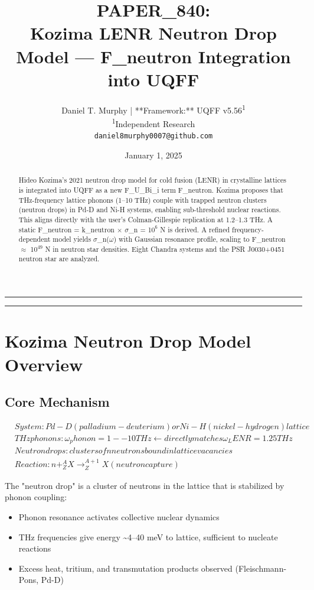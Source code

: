 \documentclass[12pt,a4paper]{article}
\title{\textbf{PAPER\_840: \\ Kozima LENR Neutron Drop Model --- F\_neutron Integration into UQFF}}
\author{
Daniel T. Murphy | **Framework:** UQFF v5.56\textsuperscript{1} \\
\small \textsuperscript{1}Independent Research \\
\small \texttt{daniel8murphy0007@github.com}
}
\date{January 1, 2025}
\begin{document}
\maketitle

\medskip\hrule\medskip

\begin{abstract}
Hideo Kozima's 2021 neutron drop model for cold fusion (LENR) in crystalline lattices is integrated into UQFF as a new F\_{U\_Bi\_i} term F\_neutron. Kozima proposes that THz-frequency lattice phonons (1--10 THz) couple with trapped neutron clusters (neutron drops) in Pd-D and Ni-H systems, enabling sub-threshold nuclear reactions. This aligns directly with the user's Colman-Gillespie replication at 1.2--1.3 THz. A static F\_neutron = k\_neutron $\times$ $\sigma$\_n = 1$0^{6}$ N is derived. A refined frequency-dependent model yields $\sigma$\_n($\omega$) with Gaussian resonance profile, scaling to F\_neutron $\approx$ 1$0^{49}$ N in neutron star densities. Eight Chandra systems and the PSR J0030+0451 neutron star are analyzed.
\end{abstract}

\medskip\hrule\medskip

\section{Kozima Neutron Drop Model Overview}

\subsection{Core Mechanism}

\begin{equation}
\begin{aligned}
  & System: Pd-D (palladium-deuterium) or Ni-H (nickel-hydrogen) lattice \\
  & THz phonons: \omega_phonon = 1--10 THz  \leftarrow directly matches \omega_LENR = 1.25 THz \\
  & Neutron drops: clusters of n neutrons bound in lattice vacancies \\
  & Reaction: n + ^A_Z X \to ^{A+1}_Z X  (neutron capture)
\end{aligned}
\end{equation}

The "neutron drop" is a cluster of neutrons in the lattice that is stabilized by phonon coupling:

\begin{itemize}
  \item Phonon resonance activates collective nuclear dynamics
  \item THz frequencies give energy \textasciitilde{}4--40 meV to lattice, sufficient to nucleate reactions
  \item Excess heat, tritium, and transmutation products observed (Fleischmann-Pons, Pd-D)
\end{itemize}
\end{document}
